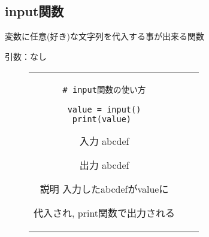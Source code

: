 \documentclass{jsarticle}
\begin{document}
\subsection{input関数}
変数に任意(好き)な文字列を代入する事が出来る関数 \par
引数：なし
\vspace{-5mm}
\begin{figure}[h]
	\begin{tabular}{ccc}
		\begin{minipage}[t]{.4\textwidth}
			\begin{lstlisting}[caption=input関数]
# input関数の使い方

value = input()
print(value) \end{lstlisting}
		\end{minipage} \hspace{5mm}
		\begin{minipage}[t]{.2\textwidth}
			\begin{itembox}[l]{入力}
				abcdef
			\end{itembox}
			\begin{itembox}[l]{出力}
				abcdef
			\end{itembox}
		\end{minipage} \hspace{5mm}
		\begin{minipage}[t]{.35\textwidth}
			\begin{itembox}[l]{説明}
				入力したabcdefがvalueに \par 代入され, print関数で出力される
			\end{itembox}
		\end{minipage}
	\end{tabular}
\end{figure}
\end{document}
